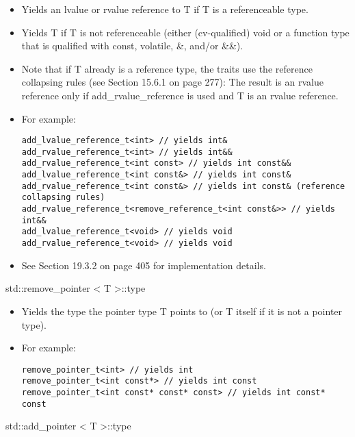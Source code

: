 \begin{itemize}
\item
Yields an lvalue or rvalue reference to T if T is a referenceable type.

\item
Yields T if T is not referenceable (either (cv-qualified) void or a function type that is qualified with const, volatile, \&, and/or \&\&).

\item
Note that if T already is a reference type, the traits use the reference collapsing rules (see Section 15.6.1 on page 277): The result is an rvalue reference only if add\_rvalue\_reference is used and T is an rvalue reference.

\item
For example:
\begin{lstlisting}[style=styleCXX]
add_lvalue_reference_t<int> // yields int&
add_rvalue_reference_t<int> // yields int&&
add_rvalue_reference_t<int const> // yields int const&&
add_lvalue_reference_t<int const&> // yields int const&
add_rvalue_reference_t<int const&> // yields int const& (reference collapsing rules)
add_rvalue_reference_t<remove_reference_t<int const&>> // yields int&&
add_lvalue_reference_t<void> // yields void
add_rvalue_reference_t<void> // yields void
\end{lstlisting}

\item
See Section 19.3.2 on page 405 for implementation details.
\end{itemize}

std::remove\_pointer < T >::type

\begin{itemize}
\item
Yields the type the pointer type T points to (or T itself if it is not a pointer type).

\item
For example:
\begin{lstlisting}[style=styleCXX]
remove_pointer_t<int> // yields int
remove_pointer_t<int const*> // yields int const
remove_pointer_t<int const* const* const> // yields int const* const
\end{lstlisting}
\end{itemize}

std::add\_pointer < T >::type

